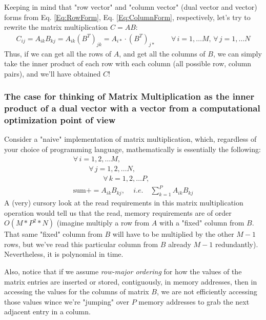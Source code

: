 \documentclass[10pt]{amsart}
\begin{document}
Keeping in mind that "row vector" and "column vector" (dual vector and vector) forms from Eq. \ref{Eq:RowForm}, Eq. \ref{Eq:ColumnForm}, respectively, let's try to rewrite the matrix multiplication $C=AB$: 
\begin{equation}\label{Eq:MatrixMultiplybyRows}
\begin{gathered}
C_{ij} = A_{ik}B_{kj} = A_{ik} (B^T)_{jk} = A_{i*} \cdot (B^T)_{j*} \qquad \, \forall \, i = 1, \dots M, \, \forall \, j = 1, \dots N
\end{gathered}
\end{equation}
Thus, if we can get all the rows of $A$, and get all the columns of $B$, we can simply take the inner product of each row with each column (all possible row, column pairs), and we'll have obtained $C$!  

\subsubsection{The case for thinking of Matrix Multiplication as the inner product of a dual vector with a vector from a computational optimization point of view}  

Consider a "naive" implementation of matrix multiplication, which, regardless of your choice of programming language, mathematically is essentially the following:  
\begin{equation}
\begin{gathered}
\forall \, i = 1,2, \dots M, \\
\phantom{\qquad \, }\forall \, j = 1,2, \dots N , \\ 
\phantom{\qquad \qquad \, } \forall \, k = 1,2,\dots P , \\ 
\text{sum} += A_{ik}B_{kj} , \quad \, i.e. \quad \sum_{k=1}^P A_{ik}B_{kj}
\end{gathered}
\end{equation}
A (very) cursory look at the read requirements in this matrix multiplication operation would tell us that the read, memory requirements are of order $O(M*P^2*N)$ (imagine multiply a row from $A$ with a "fixed" column from $B$.  That same "fixed" column from $B$ will have to be multiplied by the other $M-1$ rows, but we've read this particular column from $B$ already $M-1$ redundantly).  Nevertheless, it is polynomial in time.  

Also, notice that if we assume \emph{row-major ordering} for how the values of the matrix entries are inserted or stored, contiguously, in memory addresses, then in accessing the values for the columns of matrix $B$, we are not efficiently accessing those values wince we're "jumping" over $P$ memory addresses to grab the next adjacent entry in a column.  
\end{document}
